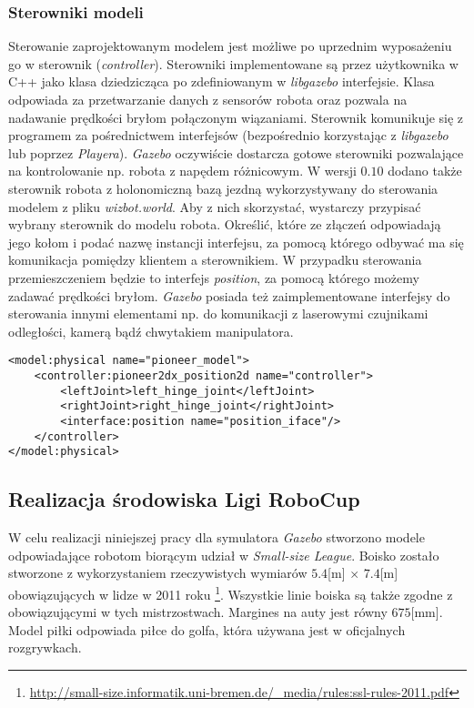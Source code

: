	\subsubsection{Sterowniki modeli }
	Sterowanie zaprojektowanym modelem jest możliwe po uprzednim wyposażeniu go w sterownik (\textit{controller}). Sterowniki implementowane są przez użytkownika w C++ jako klasa dziedzicząca
	po zdefiniowanym w \textit{libgazebo} interfejsie. Klasa odpowiada za przetwarzanie danych z sensorów robota oraz pozwala
	na nadawanie prędkości bryłom połączonym wiązaniami. Sterownik komunikuje się z programem za pośrednictwem interfejsów (bezpośrednio korzystając z \textit{libgazebo} lub poprzez \textit{Playera}).
	\textit{Gazebo} oczywiście dostarcza gotowe sterowniki pozwalające na kontrolowanie np. robota z napędem różnicowym. W wersji $0.10$ dodano także sterownik robota z holonomiczną bazą jezdną wykorzystywany
	do sterowania modelem z pliku \textit{wizbot.world}. Aby z nich skorzystać, wystarczy przypisać wybrany sterownik do modelu robota. Określić, które ze złączeń odpowiadają jego kołom i podać nazwę instancji interfejsu,
	za pomocą którego odbywać ma się komunikacja pomiędzy klientem a sterownikiem. W przypadku sterowania przemieszczeniem będzie to interfejs \textit{position}, za pomocą którego możemy zadawać prędkości bryłom.
	\textit{Gazebo} posiada też zaimplementowane interfejsy do sterowania innymi elementami np. do komunikacji z laserowymi czujnikami odległości, kamerą bądź chwytakiem manipulatora. 
	\newpage
	\begin{lstlisting}
<model:physical name="pioneer_model">
    <controller:pioneer2dx_position2d name="controller">
        <leftJoint>left_hinge_joint</leftJoint>
        <rightJoint>right_hinge_joint</rightJoint>
        <interface:position name="position_iface"/>
    </controller>
</model:physical>
	\end{lstlisting}	

	
	\subsection{Realizacja środowiska Ligi RoboCup \label{subsect:realizacjaROBOCUP} }
	
	W celu realizacji niniejszej pracy dla symulatora \textit{Gazebo} stworzono modele odpowiadające robotom biorącym udział w \emph{Small-size League}. 
	Boisko zostało stworzone z wykorzystaniem rzeczywistych wymiarów $5.4$[m] $\times$ $7.4$[m] obowiązujących w lidze w 2011 roku 
	\protect\footnote{\url{http://small-size.informatik.uni-bremen.de/_media/rules:ssl-rules-2011.pdf}}. Wszystkie linie boiska są także zgodne z obowiązującymi w tych mistrzostwach.
	Margines na auty jest równy $675$[mm].
	Model piłki odpowiada piłce do golfa, która używana jest w oficjalnych rozgrywkach.

